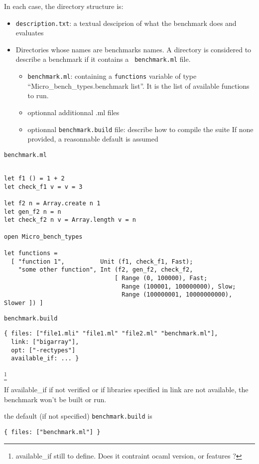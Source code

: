 \documentclass[11pt,a4paper]{article}
\begin{document}
In each case, the directory structure is:

\begin{itemize}
\item {\tt description.txt}: a textual desciprion of what the benchmark does and evaluates
\item Directories whose names are benchmarks names. A directory is
  considered to describe a benchmark if it contains a {\tt
    benchmark.ml} file.
  \begin{itemize}
  \item {\tt benchmark.ml}: containing a {\tt functions} variable of
    type ``Micro\_bench\_types.benchmark list''. It is the list of
    available functions to run.
  \item optionnal additionnal .ml files
  \item optionnal {\tt benchmark.build} file: describe how to compile the
    suite If none provided, a reasonnable default is assumed
  \end{itemize}
\end{itemize}

{\tt benchmark.ml}
\begin{verbatim}

let f1 () = 1 + 2
let check_f1 v = v = 3

let f2 n = Array.create n 1
let gen_f2 n = n
let check_f2 n v = Array.length v = n

open Micro_bench_types

let functions =
  [ "function 1",          Unit (f1, check_f1, Fast);
    "some other function", Int (f2, gen_f2, check_f2,
                               [ Range (0, 100000), Fast;
                                 Range (100001, 100000000), Slow;
                                 Range (100000001, 10000000000), Slower ]) ]

\end{verbatim}

{\tt benchmark.build}
\begin{verbatim}
{ files: ["file1.mli" "file1.ml" "file2.ml" "benchmark.ml"],
  link: ["bigarray"],
  opt: ["-rectypes"]
  available_if: ... }
\end{verbatim}
\footnote{available\_if still to define. Does it contraint ocaml version, or features ?}

If available\_if if not verified or if libraries specified in link are
not available, the benchmark won't be built or run.

the default (if not specified) {\tt benchmark.build} is
\begin{verbatim}
{ files: ["benchmark.ml"] }
\end{verbatim}
\end{document}
